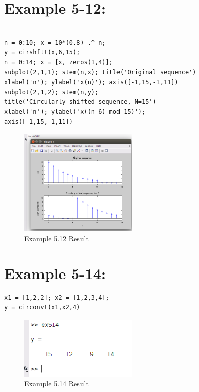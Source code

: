 \documentclass[11pt
  , a4paper
  , article
  , oneside
]{memoir}
\begin{document}
\chapter{Example 5-12:}
\begin{lstlisting}[style=termstyle]
% Example 5-12

n = 0:10; x = 10*(0.8) .^ n;
y = cirshftt(x,6,15); 
n = 0:14; x = [x, zeros(1,4)];
subplot(2,1,1); stem(n,x); title('Original sequence')
xlabel('n'); ylabel('x(n)'); axis([-1,15,-1,11])
subplot(2,1,2); stem(n,y); 
title('Circularly shifted sequence, N=15')
xlabel('n'); ylabel('x((n-6) mod 15)'); 
axis([-1,15,-1,11])
\end{lstlisting}
\begin{figure}[h!]
	\centering
	\includegraphics[width=0.5\textwidth,height=0.4\textwidth]{./images/ex512.png}
	\caption{Example 5.12 Result}
	\label{fig:Example 5.12 Result}
\end{figure}

\chapter{Example 5-14:}
\begin{lstlisting}[style=termstyle]
% Example 5-14
x1 = [1,2,2]; x2 = [1,2,3,4];
y = circonvt(x1,x2,4)
\end{lstlisting}

\begin{figure}[h!]
	\centering
	\includegraphics[width=0.5\textwidth,height=0.2\textwidth]{./images/ex514.png}
	\caption{Example 5.14 Result}
	\label{fig:Example 5.14 Result}
\end{figure}
\end{document}
